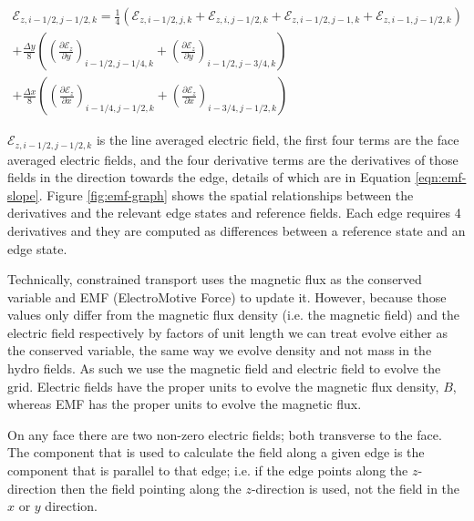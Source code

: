 \begin{equation}
    \label{eqn:emf-edge}
    \begin{aligned}
        \mathcal{E}_{z, i-1/2, j-1/2, k} = \frac{1}{4} \left(
              \mathcal{E}_{z, i-1/2, j, k}
            + \mathcal{E}_{z, i, j-1/2, k}
            + \mathcal{E}_{z, i-1/2, j-1, k}
            + \mathcal{E}_{z, i-1, j-1/2, k}\right) \\
        + \frac{\Delta y}{8} \left( \left( \frac{\partial \mathcal{E}_z }{\partial y} \right)_{i-1/2, j-1/4, k} + \left(  \frac{\partial \mathcal{E}_z }{\partial y} \right)_{i-1/2, j-3/4, k} \right) \\
        + \frac{\Delta x}{8} \left( \left( \frac{\partial \mathcal{E}_z }{\partial x} \right)_{i-1/4, j-1/2, k} + \left(  \frac{\partial \mathcal{E}_z }{\partial x} \right)_{i-3/4, j-1/2, k} \right)
    \end{aligned}
\end{equation}

$\mathcal{E}_{z, i-1/2, j-1/2, k}$ is the line averaged electric field, the first four terms are the face averaged electric fields, and the four derivative terms are the derivatives of those fields in the direction towards the edge, details of which are in Equation \ref{eqn:emf-slope}. Figure \ref{fig:emf-graph} shows the spatial relationships between the derivatives and the relevant edge states and reference fields. Each edge requires 4 derivatives and they are computed as differences between a reference state and an edge state.

Technically, constrained transport uses the magnetic flux as the conserved variable and EMF (ElectroMotive Force) to update it. However, because those values only differ from the magnetic flux density (i.e. the magnetic field) and the electric field respectively by factors of unit length we can treat evolve either as the conserved variable, the same way we evolve density and not mass in the hydro fields\citep{stone_athena_2008}. As such we use the magnetic field and electric field to evolve the grid. Electric fields have the proper units to evolve the magnetic flux density, $ B $, whereas EMF has the proper units to evolve the magnetic flux.

On any face there are two non-zero electric fields; both transverse to the face. The component that is used to calculate the field along a given edge is the component that is parallel to that edge; i.e. if the edge points along the $ z $-direction then the field pointing along the $ z $-direction is used, not the field in the $ x $ or $ y $ direction.

